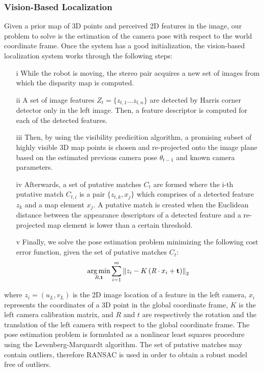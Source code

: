 \subsubsection{Vision-Based Localization}
Given a prior map of 3D points and perceived 2D features in the image,
our problem to solve is the estimation of the camera pose with respect
to the world coordinate frame. Once the system has a good
initialization, the vision-based localization system works through the
following steps:
%
\begin{enumerate}
\item[i] While the robot is moving, the stereo pair acquires a new set of images from which the disparity map is computed.
\item[ii] A set of image features $Z_{t}=\{z_{t,1} \ldots z_{t,n}\}$ are detected by Harris corner detector only in the left image. Then, a feature descriptor is computed for each of the detected features.
\item[iii] Then, by using the visibility predicition algorithm, a promising subset of highly visible 3D map points is chosen and re-projected onto the image plane based on the estimated previous camera pose $\theta_{t-1}$ and known camera parameters.
\item[iv] Afterwards, a set of putative matches $C_{t}$ are formed where the i-th putative match $C_{t,i}$ is a pair $\{z_{t,k},x_{j}\}$ which comprises of a detected feature $z_{k}$ and a map element $x_{j}$. A putative match is created when the Euclidean distance between the appearance descriptors of a detected feature and a re-projected map element is lower than a certain threshold.
\item[v] Finally, we solve the pose estimation problem minimizing the following cost error function, given the set of putative matches $C_{t}$:
%
\begin{equation} \label{eq:pose_estimation}
\argmin \limits_{\emph{R},\mathbf{t}} \sum \limits_{i=1}^{m} \left\|z_{i} - K \left(\emph{R}\cdot x_{i} + \mathbf{t} \right)\right\|_{2}
\end{equation}
%
\end{enumerate}

where $z_{i}=\left(u_{L},v_{L}\right)$ is the 2D image location of a
feature in the left camera, $x_{i}$ represents the coordinates of a 3D
point in the global coordinate frame, $K$ is the left camera
calibration matrix, and $R$ and $t$ are respectively the rotation and
the translation of the left camera with respect to the global
coordinate frame. The pose estimation problem is formulated as a
nonlinear least squares procedure using the Levenberg-Marquardt
algorithm. The set of putative matches may contain outliers, therefore
RANSAC is used in order to obtain a robust model free of outliers.

